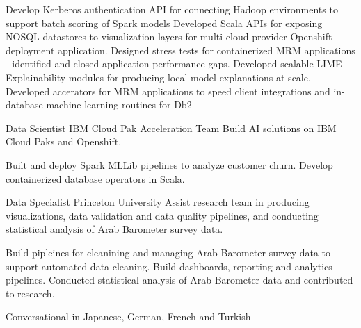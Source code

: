 \documentclass[a4paper]{Resume}
\begin{document}
{Develop Kerberos authentication API for connecting Hadoop environments to support batch scoring of Spark models}
{Developed Scala APIs for exposing NOSQL datastores to visualization layers for multi-cloud provider Openshift deployment application.}
{Designed stress tests for containerized MRM applications - identified and closed application performance gaps.}
{Developed scalable LIME Explainability modules for producing local model explanations at scale.}
{Developed accerators for MRM applications to speed client integrations and in-database machine learning routines for Db2}


{Data Scientist}
{IBM Cloud Pak Acceleration Team}
{Build AI solutions on IBM Cloud Paks and Openshift.}

{Built and deploy Spark MLLib pipelines to analyze customer churn.}
{Develop containerized database operators in Scala.}


{Data Specialist}
{Princeton University}
{Assist research team in producing visualizations, data validation and data quality pipelines, and conducting statistical analysis of Arab Barometer survey data.}

{Build pipleines for cleanining and managing Arab Barometer survey data to support automated data cleaning.}
{Build dashboards, reporting and analytics pipelines. Conducted statistical analysis of Arab Barometer data and contributed to research.}




         

		  {Conversational  in Japanese,}
		  {German,}
		  {French and}
		  {Turkish}
          
\clearpage
 
\end{document}
